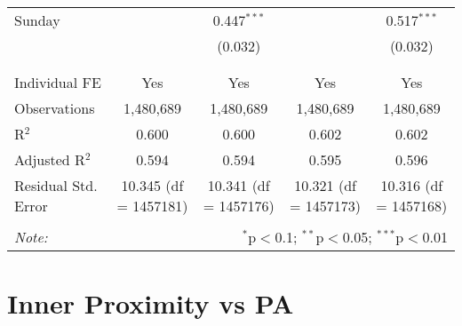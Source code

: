 \documentclass[
]{article}
\begin{document}
\begin{table}[!htbp]
{\begin{tabular}{@{\extracolsep{5pt}}lcccc}
 Sunday &  & 0.447$^{***}$ &  & 0.517$^{***}$ \\ 
  &  & (0.032) &  & (0.032) \\ 
  & & & & \\ 
\hline \\[-1.8ex] 
Individual FE & Yes & Yes & Yes & Yes \\ 
Observations & 1,480,689 & 1,480,689 & 1,480,689 & 1,480,689 \\ 
R$^{2}$ & 0.600 & 0.600 & 0.602 & 0.602 \\ 
Adjusted R$^{2}$ & 0.594 & 0.594 & 0.595 & 0.596 \\ 
Residual Std. Error & 10.345 (df = 1457181) & 10.341 (df = 1457176) & 10.321 (df = 1457173) & 10.316 (df = 1457168) \\ 
\hline 
\hline \\[-1.8ex] 
\textit{Note:}  & \multicolumn{4}{r}{$^{*}$p$<$0.1; $^{**}$p$<$0.05; $^{***}$p$<$0.01} \\ 
\end{tabular}
} 
\end{table} 
\newpage
\section{Inner Proximity vs PA}
\end{document}
